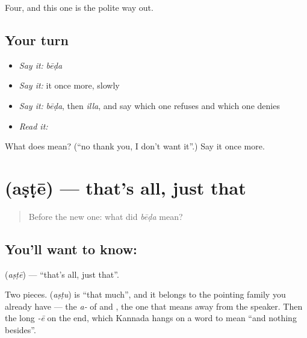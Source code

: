 \begin{grammarlens}[title={What you've built}]
Four, and this one is the polite way out.
\end{grammarlens}

\subsection*{Your turn}
\begin{itemize}
\raggedright
  \item \emph{Say it:} \emph{bēḍa}
  \item \emph{Say it:} it once more, slowly
  \item \emph{Say it:} \emph{bēḍa}, then \emph{illa}, and say which one refuses and which one denies
  \item \emph{Read it:} \textbf{}
\end{itemize}

\begin{tcolorbox}[breakable,colback=teal!4,colframe=teal!35!black,title={Before you move on}]
What does  mean? (\textquotedblleft{}no thank you, I don't want it\textquotedblright{}.) Say it once more.
\end{tcolorbox}
\section[\texorpdfstring{\kn{ಅಷ್ಟೇ} (aṣṭē)}{ಅಷ್ಟೇ (aṣṭē)}]{ (aṣṭē) — that's all, just that}

\label{lesson:KA-C58-thats-all}



\begin{quote}
Before the new one: what did \emph{bēḍa} mean?
\end{quote}

\subsection*{You'll want to know: }
\textbf{} (\emph{aṣṭē}) — \textquotedblleft{}that's all, just that\textquotedblright{}.

Two pieces.  (\emph{aṣṭu}) is \textquotedblleft{}that much\textquotedblright{}, and it belongs to the pointing family you already have — the \emph{a-} of  and , the one that means away from the speaker. Then the long \emph{-ē} on the end, which Kannada hangs on a word to mean \textquotedblleft{}and nothing besides\textquotedblright{}.

